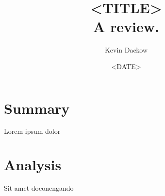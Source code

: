 \documentclass[10pt,letterpaper]{article}
\title{<TITLE> \\ \textbf{A review.}}
\author{Kevin Dackow}
\date{<DATE>}
\begin{document}
		\maketitle
\begin{multicols*}{2}[]
	\section{Summary}
    Lorem ipsum dolor

    \section{Analysis}
    Sit amet \cite{DUMMY:1} doeonengando
    

    \newpage
    

\end{multicols*}
\end{document}
